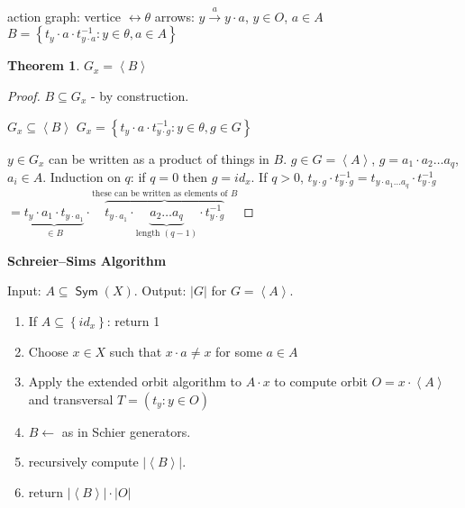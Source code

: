 \documentclass[12pt]{amsart}
\newtheorem{theorem}{Theorem}[section]
\theoremstyle{definition}
\DeclareMathOperator{\Sym}{\mathsf{Sym}}
\newcommand{\Size}[1]{\left| #1 \right|}
\begin{document}
action graph: vertice $\leftrightarrow \theta$
arrows: $y \stackrel{a}{\rightarrow} y \cdot a$, $y \in O$, $a \in A$
$B = \left\{ t_{y} \cdot a \cdot t_{y \cdot a}^{- 1} : y \in \theta, a \in A \right\}$

\begin{theorem}
$G_{x} = \left\langle B \right\rangle$
\end{theorem}

\begin{proof}
$B \subseteq G_{x}$ - by construction.

$G_{x} \subseteq \left\langle B \right\rangle$
$G_{x} = \left\{ t_{y} \cdot a \cdot t_{y \cdot g}^{ - 1 } : y \in \theta, g \in G \right\}$

$y \in G_{x}$ can be written as a product of things in $B$. $g \in G = \left\langle A \right\rangle$, $g = a_{1} \cdot a_{2} \ldots a_{q}$, $a_{i} \in A$. Induction on $q$: if $q = 0$ then $g = id_{x}$.
If $q > 0$, $t_{y \cdot g} \cdot t_{y \cdot g}^{- 1} = t_{y \cdot a_{1} \ldots a_{q}} \cdot t_{y \cdot g}^{ - 1}$
$ = \underbrace{t_{y} \cdot a_{1} \cdot t_{y \cdot a_{1}}}_{ \in B} \cdot \overbrace{t_{y \cdot a_{1}} \cdot \underbrace{a_{2} \ldots a_{q}}_{\text{length } \left( q - 1\right) } \cdot t_{y \cdot g}^{ - 1}}^{\text{these can be written as elements of } B}$
\end{proof}

\begin{center}
\textbf{Schreier--Sims Algorithm}
\end{center}

Input: $A \subseteq \Sym(X)$. Output: $\Size{G}$ for $G = \left\langle A \right\rangle$.

\begin{enumerate}
\item If $A \subseteq \left\{ id_{x} \right\}$: return 1
\item Choose $x \in X$ such that $x \cdot a \neq x$ for some $a \in A$
\item Apply the extended orbit algorithm to $A \cdot x$ to compute orbit $O = x \cdot \left\langle A \right\rangle$ and transversal $T = \left( t_{y} : y \in O \right)$
\item $B \leftarrow$ as in Schier generators.
\item recursively compute $\Size{ \left\langle B \right\rangle }$.
\item return $\Size{\left\langle B \right\rangle} \cdot \Size{O}$
\end{enumerate}
\end{document}
